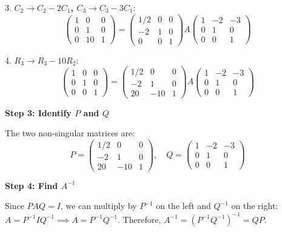 \documentclass[12pt,a3paper]{article}
\begin{document}
\begin{tcolorbox}
3. \textbf{$C_2 \to C_2 - 2C_1$, $C_3 \to C_3 - 3C_1$}:
\[
\begin{pmatrix} 1 & 0 & 0 \\ 0 & 1 & 0 \\ 0 & 10 & 1 \end{pmatrix} = 
\begin{pmatrix} 1/2 & 0 & 0 \\ -2 & 1 & 0 \\ 0 & 0 & 1 \end{pmatrix} A 
\begin{pmatrix} 1 & -2 & -3 \\ 0 & 1 & 0 \\ 0 & 0 & 1 \end{pmatrix}
\]

4. \textbf{$R_3 \to R_3 - 10R_2$}:
\[
\begin{pmatrix} 1 & 0 & 0 \\ 0 & 1 & 0 \\ 0 & 0 & 1 \end{pmatrix} = 
\begin{pmatrix} 1/2 & 0 & 0 \\ -2 & 1 & 0 \\ 20 & -10 & 1 \end{pmatrix} A 
\begin{pmatrix} 1 & -2 & -3 \\ 0 & 1 & 0 \\ 0 & 0 & 1 \end{pmatrix}
\]

\medskip
\textbf{Step 3: Identify $P$ and $Q$}

The two non-singular matrices are:
\[
P = \begin{pmatrix} 1/2 & 0 & 0 \\ -2 & 1 & 0 \\ 20 & -10 & 1 \end{pmatrix}, \quad 
Q = \begin{pmatrix} 1 & -2 & -3 \\ 0 & 1 & 0 \\ 0 & 0 & 1 \end{pmatrix}
\]

\medskip
\textbf{Step 4: Find $A^{-1}$}

Since $PAQ = I$, we can multiply by $P^{-1}$ on the left and $Q^{-1}$ on the right:
$A = P^{-1} I Q^{-1} \implies A = P^{-1} Q^{-1}$.
Therefore, $A^{-1} = (P^{-1} Q^{-1})^{-1} = QP$.


\end{tcolorbox}
\end{document}
